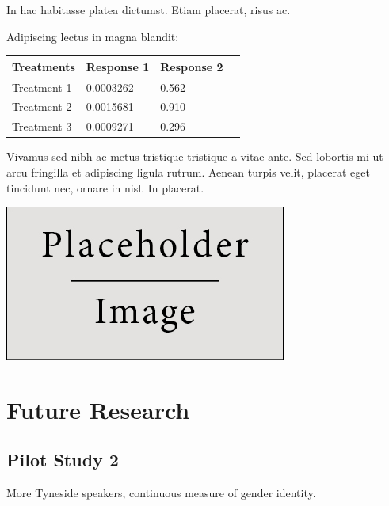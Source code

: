 \documentclass[a0,portrait]{a0poster}
\begin{document}
\begin{multicols}{2}
In hac habitasse platea dictumst. Etiam placerat, risus ac.

Adipiscing lectus in magna blandit:

\begin{center}\vspace{1cm}
\begin{tabular}{l l l l}
\toprule
\textbf{Treatments} & \textbf{Response 1} & \textbf{Response 2} \\
\midrule
Treatment 1 & 0.0003262 & 0.562 \\
Treatment 2 & 0.0015681 & 0.910 \\
Treatment 3 & 0.0009271 & 0.296 \\
\bottomrule
\end{tabular}
\end{center}\vspace{1cm}

Vivamus sed nibh ac metus tristique tristique a vitae ante. Sed lobortis mi ut arcu fringilla et adipiscing ligula rutrum. Aenean turpis velit, placerat eget tincidunt nec, ornare in nisl. In placerat.

\begin{center}\vspace{1cm}
\includegraphics[width=0.8\linewidth]{placeholder}
\end{center}\vspace{1cm}

\section*{Future Research}

\subsection{Pilot Study 2}

More Tyneside speakers, continuous measure of gender identity.


\end{multicols}
\end{document}
